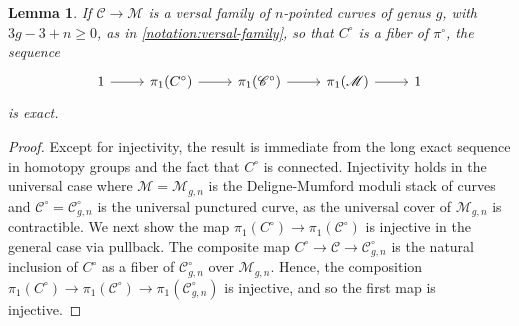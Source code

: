 \documentclass[12 pt]{amsart}
\theoremstyle{plain}
\newtheorem{lemma}[subsubsection]{Lemma}
\theoremstyle{definition}
\theoremstyle{remark}
\numberwithin{equation}{section}
\begin{document}
\begin{lemma}\label{lemma:SES-pi1-versal-curves}
If $\mathscr{C} \to \mathscr{M}$ is a versal family of $n$-pointed curves of
genus $g$, with $3g - 3 + n \geq 0$, as in \autoref{notation:versal-family},
so that $C^\circ$ is a fiber of $\pi^\circ$,
the sequence
\begin{equation}
	\label{equation:fibration-sequence}
	\begin{tikzcd}
		1 \ar {r} & \pi_1({C}^\circ)  \ar {r} &
		\pi_1(\mathscr{C}^\circ) \ar {r} & \pi_1(\mathscr{M}) \ar {r} &
		1
\end{tikzcd}\end{equation}
is exact.
\end{lemma}
\begin{proof}
Except for injectivity, the result is immediate from the long exact sequence in
homotopy groups and the fact that ${C}^\circ$ is connected. Injectivity holds in
the universal case where $\mathscr{M}=\mathscr{M}_{g,n}$ is the Deligne-Mumford
moduli stack of curves and $\mathscr{C}^\circ = \mathscr{C}^\circ_{g,n}$ is the
universal punctured curve, as the universal cover of $\mathscr{M}_{g,n}$ is contractible. 
We next show the map $\pi_1(C^\circ) \to
\pi_1(\mathscr C^\circ)$ is injective in the general case via pullback.
The composite map $C^\circ \to \mathscr C \to \mathscr{C}^\circ_{g,n}$
is the natural inclusion of $C^\circ$ as a fiber of $\mathscr{C}^\circ_{g,n}$
over $\mathscr M_{g,n}$.
Hence, the composition $\pi_1(C^\circ) \to \pi_1(\mathscr C^\circ) \to \pi_1(\mathscr
C^\circ_{g,n})$ is injective, and so the first map is injective.
\end{proof}
\end{document}
